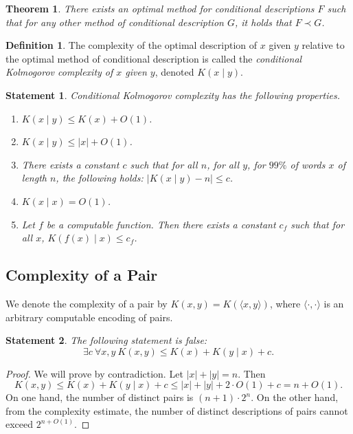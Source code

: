\documentclass[12pt,sans]{article}
\theoremstyle{definition}
\newtheorem{definition}{Definition}[section]
\theoremstyle{plain}
\newtheorem{theorem}{Theorem}[section]
\newtheorem{statement}{Statement}[section]
\theoremstyle{remark}
\begin{document}
\begin{theorem}
    There exists an optimal method for conditional descriptions $F$ such that for any other method of conditional description $G$, it holds that $F \prec G$.
\end{theorem}

\begin{definition}
    The complexity of the optimal description of $x$ given $y$ relative to the optimal method of conditional description is called the \emph{conditional Kolmogorov complexity of $x$ given $y$}, denoted $K(x \mid y)$.
\end{definition}

\begin{statement}
    Conditional Kolmogorov complexity has the following properties.
    \begin{enumerate}
        \item $K(x \mid y) \le K(x) + O(1)$.
        \item $K(x \mid y) \le |x| + O(1)$.
        \item There exists a constant $c$ such that for all $n$, for all $y$, for $99\%$ of words $x$ of length $n$, the following holds: \(|K(x \mid y) - n| \le c\).
        \item $K(x \mid x) = O(1)$.
        \item Let $f$ be a computable function. Then there exists a constant $c_f$ such that for all $x$, $K(f(x) \mid x) \le c_f$.
    \end{enumerate}
\end{statement}

\subsection{Complexity of a Pair}
We denote the complexity of a pair by $K(x,y) = K(\langle x,y\rangle)$, where $\langle\cdot,\cdot\rangle$ is an arbitrary computable encoding of pairs.

\begin{statement}
    The following statement is \emph{false}:
    \[
    \exists c\ \forall x,y\ K(x,y) \le K(x) + K(y \mid x) + c.
    \]
\end{statement}

\begin{proof}
    We will prove by contradiction. Let $|x| + |y| = n$. Then
    \[
    K(x,y) \le K(x) + K(y \mid x) + c \le |x| + |y| + 2 \cdot O(1) + c = n + O(1).
    \]
    On one hand, the number of distinct pairs is $(n+1) \cdot 2^n$. On the other hand, from the complexity estimate, the number of distinct descriptions of pairs cannot exceed $2^{n + O(1)}$.
\end{proof}
\end{document}
